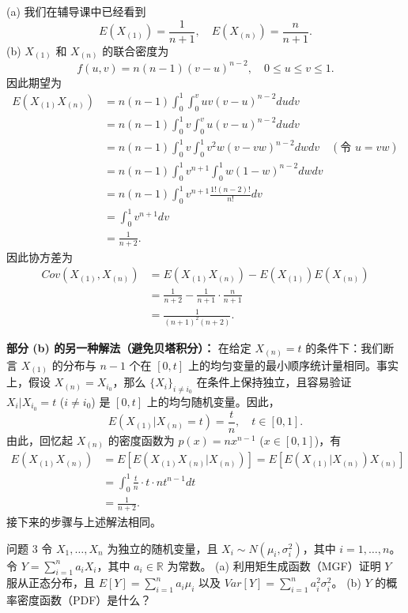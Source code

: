 \begin{questions}
\begin{solution}
(a) 我们在辅导课中已经看到
\[
E(X_{(1)}) = \frac{1}{n + 1}, \quad E(X_{(n)}) = \frac{n}{n + 1}.
\]
(b) $X_{(1)}$ 和 $X_{(n)}$ 的联合密度为
\[
f(u, v) = n(n - 1)(v - u)^{n-2}, \quad 0 \le u \le v \le 1.
\]
因此期望为
\begin{align*}
E(X_{(1)}X_{(n)}) &= n(n - 1) \int_0^1 \int_0^v uv(v - u)^{n-2} du dv \\
&= n(n - 1) \int_0^1 v \int_0^v u(v - u)^{n-2} du dv \\
&= n(n - 1) \int_0^1 v \int_0^1 v^2 w(v - vw)^{n-2} dw dv \quad (\text{令 } u = vw) \\
&= n(n - 1) \int_0^1 v^{n+1} \int_0^1 w(1 - w)^{n-2} dw dv \\
&= n(n - 1) \int_0^1 v^{n+1} \frac{1!(n - 2)!}{n!} dv \\
&= \int_0^1 v^{n+1} dv \\
&= \frac{1}{n + 2}.
\end{align*}
因此协方差为
\begin{align*}
Cov(X_{(1)}, X_{(n)}) &= E(X_{(1)}X_{(n)}) - E(X_{(1)})E(X_{(n)}) \\
&= \frac{1}{n + 2} - \frac{1}{n + 1} \cdot \frac{n}{n + 1} \\
&= \frac{1}{(n + 1)^2 (n + 2)}.
\end{align*}

\textbf{部分 (b) 的另一种解法（避免贝塔积分）：}
在给定 $X_{(n)} = t$ 的条件下：我们断言 $X_{(1)}$ 的分布与 $n-1$ 个在 $[0, t]$ 上的均匀变量的最小顺序统计量相同。事实上，假设 $X_{(n)} = X_{i_0}$，那么 $\{X_i\}_{i \neq i_0}$ 在条件上保持独立，且容易验证 $X_i | X_{i_0} = t$ ($i \neq i_0$) 是 $[0, t]$ 上的均匀随机变量。因此，
\[
E(X_{(1)} | X_{(n)} = t) = \frac{t}{n}, \quad t \in [0, 1].
\]
由此，回忆起 $X_{(n)}$ 的密度函数为 $p(x) = nx^{n-1}$ ($x \in [0, 1]$)，有
\begin{align*}
E(X_{(1)}X_{(n)}) &= E[E(X_{(1)}X_{(n)} | X_{(n)})] = E[E(X_{(1)} | X_{(n)})X_{(n)}] \\
&= \int_0^1 \frac{t}{n} \cdot t \cdot nt^{n-1} dt \\
&= \frac{1}{n + 2}.
\end{align*}
接下来的步骤与上述解法相同。
\end{solution}

\question 问题 3 令 $X_1, \dots, X_n$ 为独立的随机变量，且 $X_i \sim N(\mu_i, \sigma_i^2)$，其中 $i = 1, \dots, n$。令 $Y = \sum_{i=1}^n a_i X_i$，其中 $a_i \in \mathbb{R}$ 为常数。
(a) 利用矩生成函数（MGF）证明 $Y$ 服从正态分布，且 $E[Y] = \sum_{i=1}^n a_i \mu_i$ 以及 $Var[Y] = \sum_{i=1}^n a_i^2 \sigma_i^2$。
(b) $Y$ 的概率密度函数（PDF）是什么？


\end{questions}
